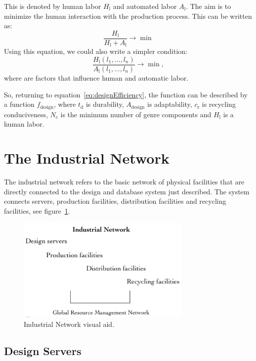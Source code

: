 \documentclass[10pt, a4paper, cleardoubleempty, openright, twoside]{book}
\begin{document}
\begin{enumerate}
	This is denoted by human labor $H_\text{l}$ and automated labor
	$A_\text{l}$. The aim is to minimize the human interaction with the
	production process. This can be written as: 
	$$
		\frac{H_\text{l}}{H_\text{l} + A_\text{l}} \rightarrow \min
	$$
  Using this equation, we could also write a simpler condition: 
	$$
		\frac{H_\text{l}(l_1,\dots,l_n)}{A_\text{l}(l_1,\dots,l_n)}
		\rightarrow \min,
	$$ 
  where are factors that influence human and automatic labor. 
\end{enumerate}

So, returning to equation~\eqref{eq:designEfficiency}, the
 function can be described by a
function $f_\text{design}$, where $t_\text{d}$ is durability,
$A_\text{design}$ is adaptability, $c_\text{r}$ is recycling
conduciveness, $N_\text{c}$ is the minimum number of genre components
and $H_\text{l}$ is a human labor. 

\section {The Industrial Network}

The industrial network refers to the basic network of physical
facilities that are directly connected to the design and database system
just described. The system connects servers, production facilities,
distribution facilities and recycling facilities, see
figure~\ref{fig:industrialNetwork}.

\begin{figure}[bt!]
	\centering
	\includegraphics[width=0.75\textwidth]{figures/industrial-network.pdf}
	\caption {Industrial Network visual aid.}
	\label{fig:industrialNetwork}
\end{figure}

\subsection {Design Servers}
\end{document}
